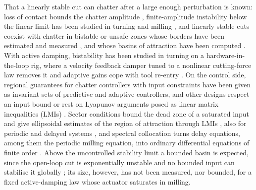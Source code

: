That a linearly stable cut can chatter after a large enough perturbation is known: loss of contact bounds the chatter amplitude \citep{tlusty1981basic}, finite-amplitude instability below the linear limit has been studied in turning and milling \citep{shi1984theory,kalmarnagy2001subcritical,balachandran2001nonlinear,stepan2005nonlinear}, and linearly stable cuts coexist with chatter in bistable or unsafe zones whose borders have been estimated \citep{dombovari2008estimates,dombovari2015bistable} and measured \citep{dombovari2019experimental}, and whose basins of attraction have been computed \citep{yan2017basins}. With active damping, bistability has been studied in turning on a hardware-in-the-loop rig, where a velocity feedback damper tuned to a nonlinear cutting-force law removes it \citep{sahu2021bistability} and adaptive gains cope with tool re-entry \citep{sahu2023adaptive}. On the control side, regional guarantees for chatter controllers with input constraints have been given as invariant sets of predictive \citep{zhang2015ellipsoid} and adaptive \citep{wu2016adaptive} controllers, and other designs respect an input bound \citep{ma2020active} or rest on Lyapunov arguments posed as linear matrix inequalities (LMIs) \citep{cao2020switched,huang2018robust}. Sector conditions bound the dead zone of a saturated input and give ellipsoidal estimates of the region of attraction through LMIs \citep{hu2001book,gomesdasilva2005antiwindup,tarbouriech2009antiwindup,tarbouriech2011book}, also for periodic and delayed systems \citep{allerhand2011robust,briat2013clock,li2015periodic,zhou2011periodic,yang2015periodic,li2017hinfinity,sakthivel2022jdsmc}, and spectral collocation turns delay equations, among them the periodic milling equation, into ordinary differential equations of finite order \citep{breda2005pseudospectral,breda2015book,butcher2009chebyshev}. Above the uncontrolled stability limit a bounded basin is expected, since the open-loop cut is exponentially unstable and no bounded input can stabilise it globally \citep{hu2001book,hu2002disturbance}; its size, however, has not been measured, nor bounded, for a fixed active-damping law whose actuator saturates in milling.

